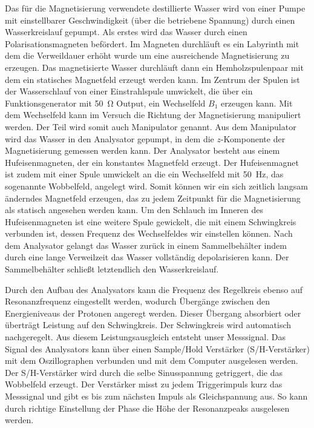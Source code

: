 \documentclass[paper=a4,
	fontsize=10pt,
	DIV=18,
	twocolumn,
	parskip=half
	]{scrartcl}
\numberwithin{equation}{section}    %
\begin{document}
Das für die Magnetisierung verwendete destillierte Wasser wird von einer Pumpe  mit einstellbarer Geschwindigkeit (über die betriebene Spannung) durch einen Wasserkreislauf gepumpt.
Als erstes wird das Wasser durch einen Polarisationsmagneten befördert. Im Magneten durchläuft es ein Labyrinth mit dem die Verweildauer erhöht wurde um eine ausreichende Magnetisierung zu erzeugen.
Das magnetisierte Wasser durchläuft dann ein Hemholzspulenpaar mit dem ein statisches Magnetfeld erzeugt werden kann. Im Zentrum der Spulen ist der Wasserschlauf von einer Einstrahlspule umwickelt, die über ein Funktionsgenerator mit \SI{50}{\ohm} Output, ein Wechselfeld $B_{1}$ erzeugen kann. Mit dem Wechselfeld kann im Versuch die Richtung der Magnetisierung manipuliert werden. Der Teil wird somit auch Manipulator genannt.
Aus dem Manipulator wird das Wasser in den Analysator gepumpt, in dem die $z$-Komponente der Magnetisierung gemessen werden kann. Der Analysator besteht aus einem Hufeisenmagneten, der ein konstantes Magnetfeld erzeugt. Der Hufeisenmagnet ist zudem mit einer Spule umwickelt an die ein Wechselfeld mit \SI{50}{\hertz}, das sogenannte Wobbelfeld, angelegt wird. Somit können wir ein sich zeitlich langsam änderndes Magnetfeld erzeugen, das zu jedem Zeitpunkt für die Magnetisierung als statisch angesehen werden kann. Um den Schlauch im Inneren des Hufeisenmagneten ist eine weitere Spule gewickelt, die mit einem Schwingkreis verbunden ist, dessen Frequenz des Wechselfeldes wir einstellen können. 
Nach dem Analysator gelangt das Wasser zurück in einem Sammelbehälter indem durch eine lange Verweilzeit das Wasser vollständig depolarisieren kann. Der Sammelbehälter schließt letztendlich den Wasserkreislauf.

Durch den Aufbau des Analysators kann die Frequenz des Regelkreis ebenso auf Resonanzfrequenz eingestellt werden, wodurch Übergänge zwischen den Energieniveaus der Protonen angeregt werden. Dieser Übergang absorbiert oder überträgt Leistung auf den Schwingkreis. Der Schwingkreis wird automatisch nachgeregelt. Aus diesem Leistungsausgleich entsteht unser Messsignal.
Das Signal des Analysators kann über einen Sample/Hold Verstärker (S/H-Verstärker) mit dem Oszillographen verbunden und mit dem Computer ausgelesen werden.
Der S/H-Verstärker wird durch die selbe Sinusspannung getriggert, die das Wobbelfeld erzeugt. Der Verstärker misst zu jedem Triggerimpuls kurz das Messsignal und gibt es bis zum nächsten Impuls als Gleichspannung aus. So kann durch richtige Einstellung der Phase die Höhe der Resonanzpeaks ausgelesen werden.
\end{document}

